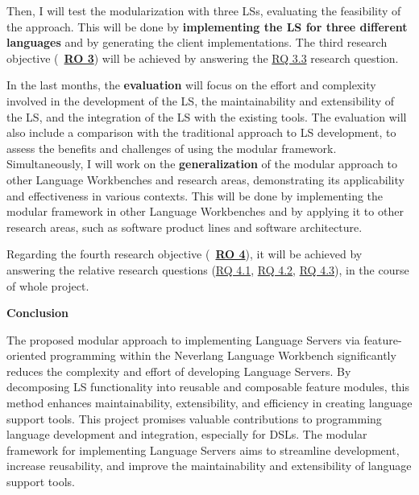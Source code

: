 Then, I will test the modularization with three LSs, evaluating the feasibility of the approach. This will be done by \textbf{implementing the LS for three different languages} and by generating the client implementations. The third research objective (~\hyperlink{ro3}{\textbf{RO 3}}) will be achieved by answering the \hyperlink{rq33}{\textsf{RQ 3.3}} research question.

In the last months, the \textbf{evaluation} will focus on the effort and complexity involved in the development of the LS, the maintainability and extensibility of the LS, and the integration of the LS with the existing tools. The evaluation will also include a comparison with the traditional approach to LS development, to assess the benefits and challenges of using the modular framework.
Simultaneously, I will work on the \textbf{generalization} of the modular approach to other Language Workbenches and research areas, demonstrating its applicability and effectiveness in various contexts. This will be done by implementing the modular framework in other Language Workbenches and by applying it to other research areas, such as software product lines and software architecture.

Regarding the fourth research objective (~\hyperlink{ro4}{\textbf{RO 4}}), it will be achieved by answering the relative research questions (\hyperlink{rq41}{\textsf{RQ 4.1}}, \hyperlink{rq42}{\textsf{RQ 4.2}}, \hyperlink{rq43}{\textsf{RQ 4.3}}), in the course of whole project.

\hfill \break
\noindent
\textbf{Conclusion}

The proposed modular approach to implementing Language Servers via feature-oriented programming within the Neverlang Language Workbench significantly reduces the complexity and effort of developing Language Servers. By decomposing LS functionality into reusable and composable feature modules, this method enhances maintainability, extensibility, and efficiency in creating language support tools. This project promises valuable contributions to programming language development and integration, especially for DSLs. The modular framework for implementing Language Servers aims to streamline development, increase reusability, and improve the maintainability and extensibility of language support tools.
